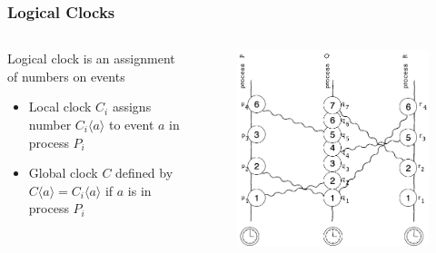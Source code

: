 \documentclass{beamer}
\begin{document}
\frame
{
	\frametitle{Logical Clocks}

	\begin{columns}
	\begin{column}{0.6\textwidth}

		Logical clock is an assignment of numbers on events
		\begin{itemize}
			\item<2-> Local clock $C_i$ assigns number $C_i\langle a\rangle$ to event $a$ in process $P_i$
			\item<3-> Global clock $C$ defined by $C\langle a\rangle=C_i\langle a\rangle$ if $a$ is in process $P_i$
		\end{itemize}


	\end{column}
	\begin{column}{0.4\textwidth}

		\begin{figure}[ht!]
		\includegraphics[width=\textwidth]{files/ClockDist-Logical-Clock.png}
		\end{figure}


	\end{column}
	\end{columns}


}
\end{document}
